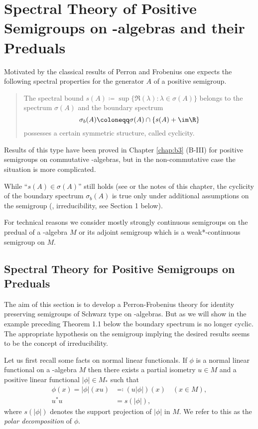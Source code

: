 \setcounter{chapter}{2}		%
\setcounter{section}{1}		%
\chapter{Spectral Theory of Positive Semigroups on \WA-algebras and their Preduals}\label{chap:D-III}
Motivated by the classical results of Perron and Frobenius one expects the following spectral properties for the generator $A$ of a positive semigroup. 
\begin{quote}
The spectral bound 
$s(A) \coloneqq \sup\{\Re(\lambda) \colon \lambda \in \sigma(A)\}$ belongs to the spectrum $\sigma(A)$ and the boundary spectrum
\[
\sigma_{b}(A) \coloneqq \sigma(A) \cap \{s(A)+\im\R\}
\]
possesses a certain symmetric structure, called cyclicity.
\end{quote}
Results of this type have been proved in Chapter \ref{chap:b3} (B-III) for positive semigroups on commutative \CA-algebras, but in the non-commutative case the situation is more complicated.

While \enquote{$s(A) \in \sigma(A)$} still holds (see \citet{greinervoigtwolff:1980} %
or the notes of this chapter, the cyclicity of the boundary spectrum $\sigma_{b}(A)$ is true only under additional assumptions on the semigroup (\eg, irreducibility, see Section 1 below).

For technical reasons we consider mostly strongly continuous semigroups on the predual of a \WA-algebra $M$ or its adjoint semigroup which is a weak*-continuous semigroup on $M$.
\section{Spectral Theory for Positive Semigroups on Preduals}\label{sec:d3-1}
The aim of this section is to develop a Perron-Frobenius theory for identity preserving semigroups of Schwarz type on \WA-algebras.
But as we will show in the example preceding Theorem 1.1 below the boundary spectrum is no longer cyclic.
The appropriate hypothesis on the semigroup implying the desired results seems to be the concept of irreducibility.

Let us first recall some facts on normal linear functionals.
If $\phi$ is a normal linear functional on a \WA-algebra $M$ then there exists a partial isometry $u \in M$ and a positive linear functional $|\phi| \in M_{*}$ such that
\begin{align*}
	\phi(x) = |\phi|(xu) & \eqqcolon  (u|\phi|)(x) \quad (x \in M), \\
	u^{*}u  &= s(|\phi|),
\end{align*}
where $s(|\phi|)$ denotes the support projection of $|\phi|$ in $M$.
We refer to this as the \emph{polar decomposition} of $\phi$.

